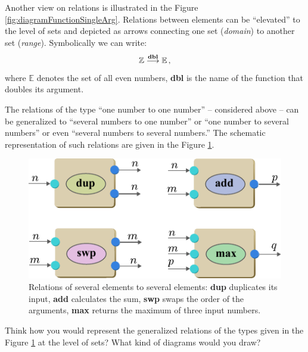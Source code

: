 Another view on relations is illustrated in the Figure
\ref{fig:diagramFunctionSingleArg}. Relations between elements can be
``elevated'' to the level of sets and depicted as arrows connecting
one set (\emph{domain}) to another set (\emph{range}). Symbolically we
can write:
\[
\mathbb{Z}\overset{\textrm{\bf dbl}}{\longrightarrow} \mathbb{E}\,,
\]
where $\mathbb{E}$ denotes the set of all even numbers, {\bf dbl} is the
name of the function that doubles its argument.

The relations of the type ``one number to one number'' -- considered
above -- can be
generalized to ``several numbers to one number'' or ``one number to
several numbers'' or even ``several numbers to several numbers.'' The
schematic representation of such relations are given in the
Figure \ref{fig:schematicRelationNtoN}.
\begin{figure}[htbp]
  \centering
  \includegraphics[scale=1.0]{schematicRelationNtoN}
  \caption{Relations of several elements to several elements:
    {\bf dup} duplicates its input, {\bf add} calculates the sum,
    {\bf swp} swaps the order of the arguments, {\bf max} returns the
    maximum of three input numbers.}
  \label{fig:schematicRelationNtoN}
\end{figure}

\begin{exercise}\label{exe:relationsGeneral}
Think how you would represent the generalized relations of the types
given in the Figure \ref{fig:schematicRelationNtoN} at the level of
sets? What kind of diagrams would you draw?
\end{exercise}

